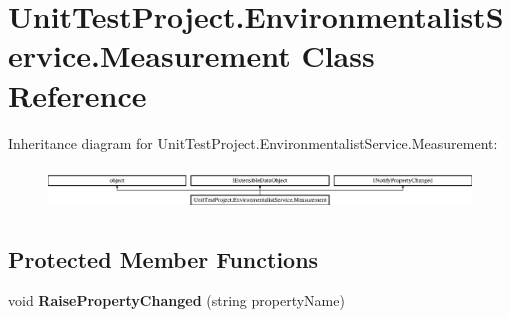 \hypertarget{class_unit_test_project_1_1_environmentalist_service_1_1_measurement}{}\section{Unit\+Test\+Project.\+Environmentalist\+Service.\+Measurement Class Reference}
\label{class_unit_test_project_1_1_environmentalist_service_1_1_measurement}
Inheritance diagram for Unit\+Test\+Project.\+Environmentalist\+Service.\+Measurement\+:\begin{figure}[H]
\begin{center}
\leavevmode
\includegraphics[height=1.152263cm]{class_unit_test_project_1_1_environmentalist_service_1_1_measurement}
\end{center}
\end{figure}
\subsection*{Protected Member Functions}
\begin{DoxyCompactItemize}
\item 
\hypertarget{class_unit_test_project_1_1_environmentalist_service_1_1_measurement_ad54b46c9e481e72e5e68202460626c85}{}void {\bfseries Raise\+Property\+Changed} (string property\+Name)\label{class_unit_test_project_1_1_environmentalist_service_1_1_measurement_ad54b46c9e481e72e5e68202460626c85}

\end{DoxyCompactItemize}

